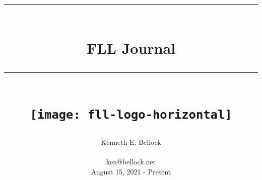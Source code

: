 \documentclass[index=totoc,hyperref, openany]{labbook} %
\date{} %
\newcommand{\HRule}{\rule{\linewidth}{0.5mm}} %
\begin{document}
 

\frontmatter
\title{
	\begin{center}
	  \HRule \\[0.4cm]
	  { \Huge \bfseries FLL Journal}\\[0.4cm]
	  \HRule \\[1.5cm]
                  \texttt{[image: fll-logo-horizontal]}
	\end{center}
}
\author{\Huge Kenneth E. Bellock \\ \\ \LARGE ken@bellock.net \\[1.5cm] August 15, 2021 - Present\\[1.5cm]}
\maketitle

\printindex
\printglossaries
\glsaddall
\tableofcontents

\mainmatter



\end{document}
